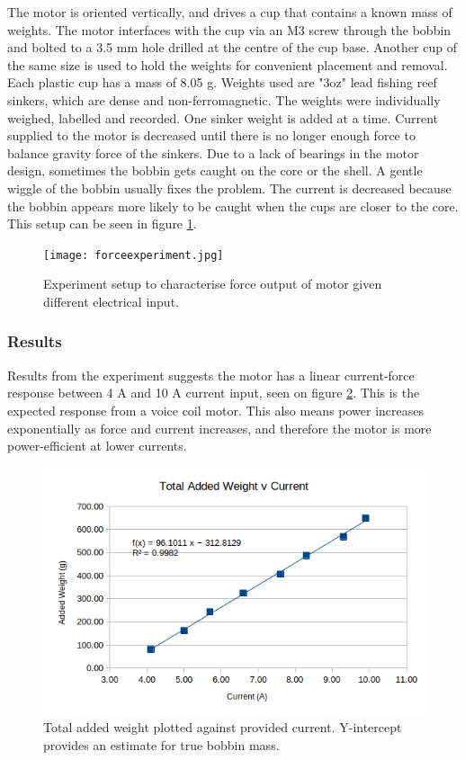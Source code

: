 \documentclass[a4paper,12pt]{article}
\begin{document}
The motor is oriented vertically, and drives a cup that contains a known mass of weights. The motor interfaces with the cup via an M3 screw through the bobbin and bolted to a 3.5 mm hole drilled at the centre of the cup base. Another cup of the same size is used to hold the weights for convenient placement and removal. Each plastic cup has a mass of 8.05 g. Weights used are "3oz" lead fishing reef sinkers, which are dense and non-ferromagnetic. The weights were individually weighed, labelled and recorded. One sinker weight is added at a time. Current supplied to the motor is decreased until there is no longer enough force to balance gravity force of the sinkers. Due to a lack of bearings in the motor design, sometimes the bobbin gets caught on the core or the shell. A gentle wiggle of the bobbin usually fixes the problem. The current is decreased because the bobbin appears more likely to be caught when the cups are closer to the core. This setup can be seen in figure \ref{fg:forceexperiment}.

\begin{figure}[h!]
    \centering
    \texttt{[image: forceexperiment.jpg]}
    \caption{Experiment setup to characterise force output of motor given different electrical input.}
    \label{fg:forceexperiment}
\end{figure}

\subsubsection{Results}

Results from the experiment suggests the motor has a linear current-force response between 4 A and 10 A current input, seen on figure \ref{fg:forceplot}. This is the expected response from a voice coil motor. This also means power increases exponentially as force and current increases, and therefore the motor is more power-efficient at lower currents.

\begin{figure}[h!]
    \centering
    \includegraphics[width=\textwidth]{resultforcevcurrent.png}
    \caption{Total added weight plotted against provided current. Y-intercept provides an estimate for true bobbin mass.}
    \label{fg:forceplot}
\end{figure}
\end{document}

